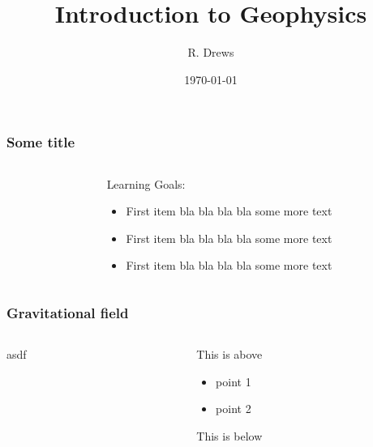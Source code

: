 \documentclass[t,14pt,aspectratio=169]{beamer}
\title{Introduction to Geophysics}
\author{R. Drews}
\date{\today}
\begin{document}
%

\titleframe
\begin{frame}
  \frametitle{Some title}
  \setlength{\leftmargini}{0.5em}
  \begin{columns}[c, onlytextwidth]%
      \begin{column}{.6\textwidth}%
          \setlength{\partopsep}{0pt}%
      \end{column}%
      \begin{column}{.35\textwidth}

          \alert{Learning Goals:}
          \begin{center}
          \begin{itemize}
            \itemsep 1.0em
                \item First item bla bla bla bla some more text
                \item First item bla bla bla bla some more text
                \item First item bla bla bla bla some more text
            \end{itemize}
      \end{center}
      \end{column}%
  \end{columns}
  \end{frame}




\begin{frame}
  \frametitle{Gravitational field}
  \begin{columns}[onlytextwidth] 
    \begin{column}{.6\textwidth}
      \centering
      asdf
    \end{column}%
    \hfill%
    \begin{column}{.4\textwidth}
     
    This is above
      \begin{itemize}
        \itemsep 0.8em
        \item point 1
        \item point 2
    
      \end{itemize}
 
    This is below
 
    \end{column}%
    \end{columns}
\end{frame}
\end{document}

